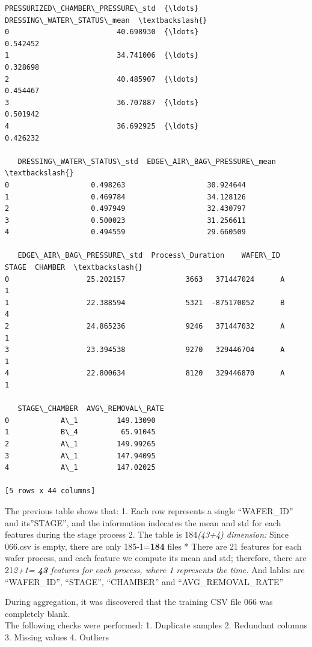 \documentclass[11pt]{article}
\begin{document}
\begin{tcolorbox}[breakable, size=fbox, boxrule=.5pt, pad at break*=1mm, opacityfill=0]
\begin{Verbatim}[commandchars=\\\{\}]
   PRESSURIZED\_CHAMBER\_PRESSURE\_std  {\ldots}  DRESSING\_WATER\_STATUS\_mean  \textbackslash{}
0                         40.698930  {\ldots}                    0.542452
1                         34.741006  {\ldots}                    0.328698
2                         40.485907  {\ldots}                    0.454467
3                         36.707887  {\ldots}                    0.501942
4                         36.692925  {\ldots}                    0.426232

   DRESSING\_WATER\_STATUS\_std  EDGE\_AIR\_BAG\_PRESSURE\_mean  \textbackslash{}
0                   0.498263                   30.924644
1                   0.469784                   34.128126
2                   0.497949                   32.430797
3                   0.500023                   31.256611
4                   0.494559                   29.660509

   EDGE\_AIR\_BAG\_PRESSURE\_std  Process\_Duration    WAFER\_ID  STAGE  CHAMBER  \textbackslash{}
0                  25.202157              3663   371447024      A        1
1                  22.388594              5321  -875170052      B        4
2                  24.865236              9246   371447032      A        1
3                  23.394538              9270   329446704      A        1
4                  22.800634              8120   329446870      A        1

   STAGE\_CHAMBER  AVG\_REMOVAL\_RATE
0            A\_1         149.13090
1            B\_4          65.91045
2            A\_1         149.99265
3            A\_1         147.94095
4            A\_1         147.02025

[5 rows x 44 columns]
\end{Verbatim}
\end{tcolorbox}
        
    The previous table shows that: 1. Each row represents a single
``WAFER\_ID'' and its''STAGE'', and the information indecates the mean
and std for each features during the stage process 2. The table is
184\emph{(43+4) dimension: } Since 066.csv is empty, there are only
185-1=\textbf{184} files * There are 21 features for each wafer process,
and each feature we compute its mean and std; therefore, there are
21\emph{2+1= \textbf{43} features for each process, where 1 represents
the time. } And lables are ``WAFER\_ID'', ``STAGE'', ``CHAMBER'' and
``AVG\_REMOVAL\_RATE''

    During aggregation, it was discovered that the training CSV file 066 was
completely blank.\\
The following checks were performed: 1. Duplicate samples 2. Redundant
columns 3. Missing values 4. Outliers
\end{document}
